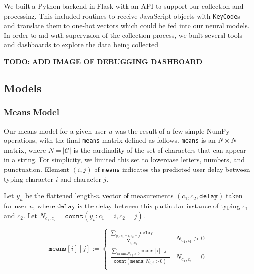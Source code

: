 \documentclass{amsart}
\begin{document}
\begin{multicols*}{2}
We built a Python backend in Flask with an API to support our collection and processing. This included routines to receive JavaScript objects with \texttt{KeyCode}s and translate them to one-hot vectors which could be fed into our neural models. In order to aid with supervision of the collection process, we built several tools and dashboards to explore the data being collected.

\textbf{TODO: ADD IMAGE OF DEBUGGING DASHBOARD}

\subsection{Models}
\subsubsection{Means Model}
Our means model for a given user $u$ was the result of a few simple NumPy operations, with the final \texttt{means} matrix defined as follows. \texttt{means} is an $N \times N$ matrix, where $N = |\mathcal{C}|$ is the cardinality of the set of characters that can appear in a string. For simplicity, we limited this set to lowercase letters, numbers, and punctuation. Element $(i, j)$ of \texttt{means} indicates the predicted user delay between typing character $i$ and character $j$.

Let $y_u$ be the flattened length-$n$ vector of measurements $(c_1, c_2, \texttt{delay})$ taken for user $u$, where $\texttt{delay}$ is the delay between this particular instance of typing $c_1$ and $c_2$. Let $N_{c_1, c_2} = \texttt{count}(y_u : c_1 = i, c_2 = j)$.

\[ \texttt{means}[i][j] :=
  \begin{cases}
      \frac{\sum_{y_u : c_1 = i, c_2 = j}{\texttt{delay}}}{N_{c_1, c_2}} & N_{c_1, c_2} > 0 \\
      \frac{\sum_{\texttt{means} : N_{i, j} > 0}{\texttt{means}[i][j]}}{\texttt{count}(\texttt{means} : N_{i, j} > 0)} & N_{c_1, c_2} = 0 \\
   \end{cases}
\]


\end{multicols*}
\end{document}
